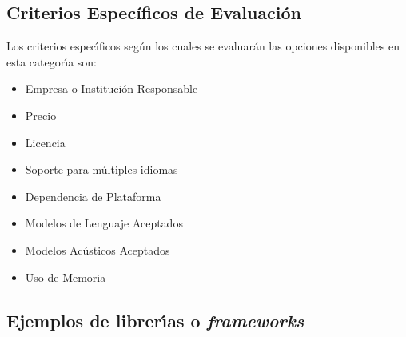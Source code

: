 \subsection{Criterios Espec\'ificos de Evaluaci\'on}

Los criterios espec{\'\i}ficos seg\'un los cuales se evaluar\'an las opciones disponibles en esta
categor{\'\i}a son:

\begin{itemize}
	\item Empresa o Instituci\'on Responsable
	\item Precio
	\item Licencia
	\item Soporte para m\'ultiples idiomas
	\item Dependencia de Plataforma
	\item Modelos de Lenguaje Aceptados
	\item Modelos Ac\'usticos Aceptados
	\item Uso de Memoria
\end{itemize}


\subsection{Ejemplos de librer{\'\i}as o \emph{frameworks}}






